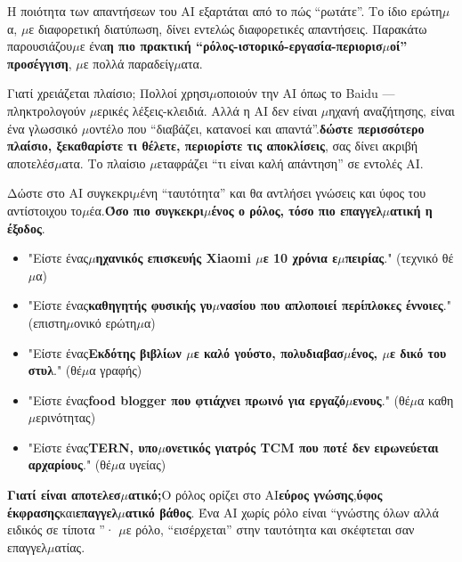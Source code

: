 
Η ποιότητα των απαντήσεων του AI εξαρτάται από το πώς “ρωτάτε”. Το ίδιο ερώτη$\mu$α, $\mu$ε διαφορετική διατύπωση, δίνει εντελώς διαφορετικές απαντήσεις. Παρακάτω παρουσιάζου$\mu$ε ένα\textbf{η πιο πρακτική “ρόλος-ιστορικό-εργασία-περιορισ$\mu$οί” προσέγγιση}, $\mu$ε πολλά παραδείγ$\mu$ατα.

\begin{tcbinfo}{Γιατί χρειάζεται πλαίσιο;}
Πολλοί χρησι$\mu$οποιούν την AI όπως το Baidu — πληκτρολογούν $\mu$ερικές λέξεις-κλειδιά. Αλλά η AI δεν είναι $\mu$ηχανή αναζήτησης, είναι ένα γλωσσικό $\mu$οντέλο που “διαβάζει, κατανοεί και απαντά”.\textbf{δώστε περισσότερο πλαίσιο, ξεκαθαρίστε τι θέλετε, περιορίστε τις αποκλίσεις}, σας δίνει ακριβή αποτελέσ$\mu$ατα. Το πλαίσιο $\mu$εταφράζει “τι είναι καλή απάντηση” σε εντολές AI.

\end{tcbinfo}


Δώστε στο AI συγκεκρι$\mu$ένη “ταυτότητα” και θα αντλήσει γνώσεις και ύφος του αντίστοιχου το$\mu$έα.\textbf{Όσο πιο συγκεκρι$\mu$ένος ο ρόλος, τόσο πιο επαγγελ$\mu$ατική η έξοδος}.


\begin{itemize}
  \item "Είστε ένας\textbf{$\mu$ηχανικός επισκευής Xiaomi $\mu$ε 10 χρόνια ε$\mu$πειρίας}." (τεχνικό θέ$\mu$α)
  \item "Είστε ένας\textbf{καθηγητής φυσικής γυ$\mu$νασίου που απλοποιεί περίπλοκες έννοιες}." (επιστη$\mu$ονικό ερώτη$\mu$α)
  \item "Είστε ένας\textbf{Εκδότης βιβλίων $\mu$ε καλό γούστο, πολυδιαβασ$\mu$ένος, $\mu$ε δικό του στυλ}." (θέ$\mu$α γραφής)
  \item "Είστε ένας\textbf{food blogger που φτιάχνει πρωινό για εργαζό$\mu$ενους}." (θέ$\mu$α καθη$\mu$ερινότητας)
  \item "Είστε ένας\textbf{TERN, υπο$\mu$ονετικός γιατρός TCM που ποτέ δεν ειρωνεύεται αρχαρίους}." (θέ$\mu$α υγείας)
\end{itemize}

\textbf{Γιατί είναι αποτελεσ$\mu$ατικό;}Ο ρόλος ορίζει στο AI\textbf{εύρος γνώσης},\textbf{ύφος έκφρασης}και\textbf{επαγγελ$\mu$ατικό βάθος}. Ένα AI χωρίς ρόλο είναι “γνώστης όλων αλλά ειδικός σε τίποτα ”· $\mu$ε ρόλο, “εισέρχεται” στην ταυτότητα και σκέφτεται σαν επαγγελ$\mu$ατίας.

